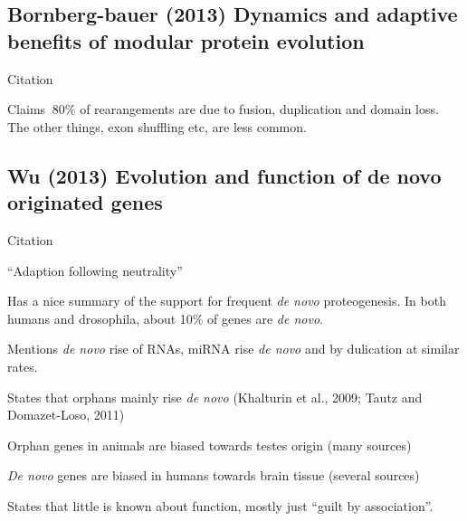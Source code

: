 \subsection{Bornberg-bauer (2013) Dynamics and adaptive benefits of modular
protein evolution}

    Citation \cite{bornberg-bauer_dynamics_2013}

    Claims $~80\%$ of rearangements are due to fusion, duplication and domain
    loss. The other things, exon shuffling etc, are less common.


\subsection{Wu (2013) Evolution and function of de novo
originated genes}

    Citation \cite{wu_evolution_2013}

    ``Adaption following neutrality''

    Has a nice summary of the support for frequent \textit{de novo}
    proteogenesis. In both humans and drosophila, about 10\% of genes are
    \textit{de novo}.

    Mentions \textit{de novo} rise of RNAs, miRNA rise \textit{de novo} and
    by dulication at similar rates.

    States that orphans mainly rise \textit{de novo} (Khalturin et al.,
    2009; Tautz and Domazet-Loso, 2011)

    Orphan genes in animals are biased towards testes origin (many sources)

    \textit{De novo} genes are biased in humans towards brain tissue
    (several sources)

    States that little is known about function, mostly just ``guilt by
    association''.

